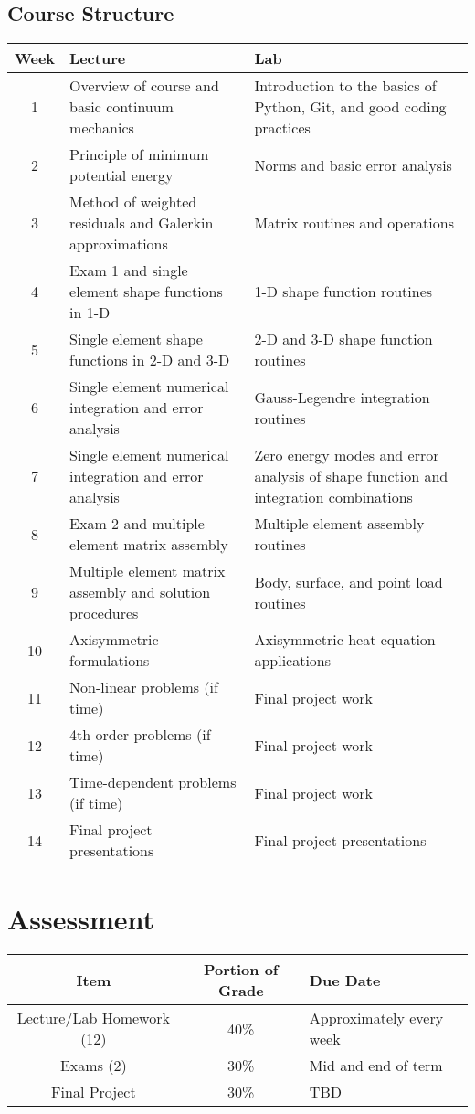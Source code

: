 \documentclass[12pt,letterpaper]{article}
\begin{document}
\subsection*{Course Structure}
\begin{center}
    \begin{tabular}{ | c | p{7cm} | p{7cm} |}
    \hline
    Week & Lecture & Lab \\ \hline
    1 & Overview of course and basic continuum mechanics& Introduction to the basics of Python, Git, and good coding practices\\ \hline
    2 & Principle of minimum potential energy& Norms and basic error analysis\\ \hline
    3 & Method of weighted residuals and Galerkin approximations& Matrix routines and operations\\ \hline
    4 & Exam 1 and single element shape functions in 1-D& 1-D shape function routines\\ \hline
    5 & Single element shape functions in 2-D and 3-D & 2-D and 3-D shape function routines\\\hline
    6 & Single element numerical integration and error analysis & Gauss-Legendre integration routines\\\hline
    7 & Single element numerical integration and error analysis & Zero energy modes and error analysis of shape function and integration combinations\\\hline
    8 & Exam 2 and multiple element matrix assembly & Multiple element assembly routines \\\hline
    9 & Multiple element matrix assembly and solution procedures & Body, surface, and point load routines \\\hline
    10 & Axisymmetric formulations & Axisymmetric heat equation applications \\\hline
    11 & Non-linear problems (if time) & Final project work \\\hline
    12 & 4th-order problems (if time)& Final project work \\\hline
    13 & Time-dependent problems (if time)& Final project work \\\hline
    14 & Final project presentations & Final project presentations \\\hline
    \end{tabular}
\end{center}

\section{Assessment}
\begin{center}
    \begin{tabular}{ | c | c | p{5cm} |}
    \hline
    Item & Portion of Grade & Due Date \\ \hline
    Lecture/Lab Homework (12)& 40\% & Approximately every week\\ \hline
    Exams (2)& 30\% & Mid and end of term\\ \hline
    Final Project& 30\% & TBD\\ 
    \hline
    \end{tabular}
\end{center}
\end{document}
